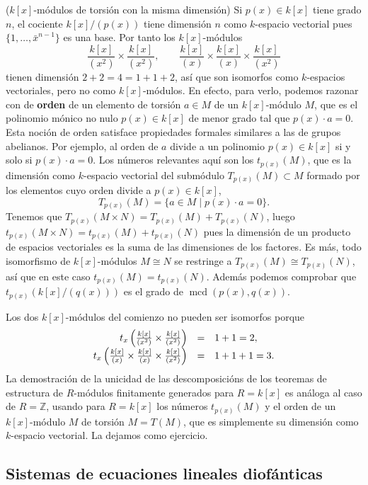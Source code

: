 \textrm{\normalfont ($k[x]$-módulos de torsión con la misma dimensión)}
Si \(p(x)\in k[x]\) tiene grado \(n\), el cociente \(k[x]/(p(x))\) tiene
dimensión \(n\) como \(k\)-espacio vectorial pues
\(\{1,\dots,\bar x^{n-1}\}\) es una base. Por tanto los
\(k[x]\)-módulos
\[\frac{k[x]}{(x^2)}\times \frac{k[x]}{(x^2)},\qquad \frac{k[x]}{(x)}\times \frac{k[x]}{(x)}\times \frac{k[x]}{(x^2)}\]
tienen dimensión \(2+2=4=1+1+2\), así que son isomorfos como
\(k\)-espacios vectoriales, pero no como \(k[x]\)-módulos. En efecto,
para verlo, podemos razonar con de \textbf{orden} de un elemento de
torsión \(a\in M\) de un \(k[x]\)-módulo \(M\), que es el polinomio
mónico no nulo \(p(x)\in k[x]\) de menor grado tal que
\(p(x)\cdot a=0\). Esta noción de orden satisface propiedades formales
similares a las de grupos abelianos. Por ejemplo, al orden de \(a\)
divide a un polinomio \(p(x)\in k[x]\) si y solo si \(p(x)\cdot a=0\).
Los números relevantes aquí son los \(t_{p(x)}(M)\), que es la
dimensión como \(k\)-espacio vectorial del submódulo
\(T_{p(x)}(M)\subset M\) formado por los elementos cuyo orden divide a
\(p(x)\in k[x]\), \[T_{p(x)}(M)=\{a\in M\mid p(x)\cdot a=0\}.\]
Tenemos que \(T_{p(x)}(M\times N)=T_{p(x)}(M)+ T_{p(x)}(N)\), luego
\(t_{p(x)}(M\times N)=t_{p(x)}(M)+ t_{p(x)}(N)\) pues la dimensión de
un producto de espacios vectoriales es la suma de las dimensiones de los
factores. Es más, todo isomorfismo de \(k[x]\)-módulos \(M\cong N\) se
restringe a \(T_{p(x)}(M)\cong T_{p(x)}(N)\), así que en este caso
\(t_{p(x)}(M)= t_{p(x)}(N)\). Además podemos comprobar que
\(t_{p(x)}(k[x]/(q(x)))\) es el grado de
\(\operatorname{mcd}(p(x),q(x))\).

Los dos \(k[x]\)-módulos del comienzo no pueden ser isomorfos porque
\[\begin{array}{rcl} t_{x}\left(\frac{k[x]}{(x^2)}\times \frac{k[x]}{(x^2)}\right)&=&1+1=2,\cr t_{x}\left(\frac{k[x]}{(x)}\times \frac{k[x]}{(x)}\times \frac{k[x]}{(x^2)}\right)&=&1+1+1=3. \end{array}\]
La demostración de la unicidad de las descomposicións de los teoremas de
estructura de \(R\)-módulos finitamente generados para \(R=k[x]\) es
análoga al caso de \(R=\mathbb Z\), usando para \(R=k[x]\) los números
\(t_{p(x)}(M)\) y el orden de un \(k[x]\)-módulo \(M\) de torsión
\(M=T(M)\), que es simplemente su dimensión como \(k\)-espacio
vectorial. La dejamos como ejercicio. 

\hypertarget{sistemas-de-ecuaciones-lineales-diofuxe1nticas}{%
\subsection{Sistemas de ecuaciones lineales
diofánticas}\label{sistemas-de-ecuaciones-lineales-diofuxe1nticas}}

